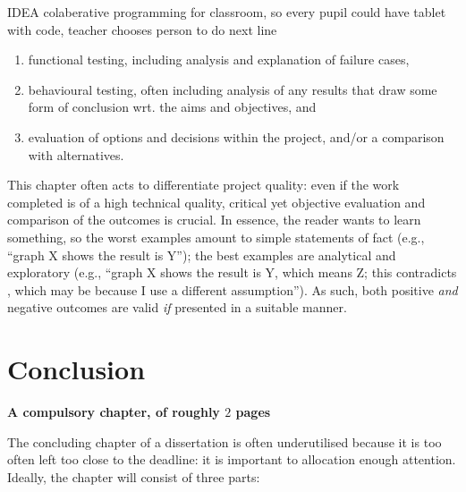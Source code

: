 \documentclass[ %
                    author={Jonathan Rankin},
                supervisor={Dr. David May, Dr. Ian Holyer},
                    degree={MEng},
                     title={CodeTouch},
                  subtitle={A Revolutionary Way To Program Real Code On Touch Screen Devices},
                      type={enterprise},
                      year={2015 } ]{dissertation}
\begin{document}
IDEA colaberative programming for classroom, so every pupil could have tablet with code, teacher chooses person to do next line

\begin{enumerate}
\item functional  testing, including analysis and explanation of failure 
      cases,
\item behavioural testing, often including analysis of any results that 
      draw some form of conclusion wrt. the aims and objectives,
      and
\item evaluation of options and decisions within the project, and/or a
      comparison with alternatives.
\end{enumerate}



\noindent
This chapter often acts to differentiate project quality: even if the work
completed is of a high technical quality, critical yet objective evaluation 
and comparison of the outcomes is crucial.  In essence, the reader wants to
learn something, so the worst examples amount to simple statements of fact 
(e.g., ``graph X shows the result is Y''); the best examples are analytical 
and exploratory (e.g., ``graph X shows the result is Y, which means Z; this 
contradicts , which may be because I use a different assumption'').  As 
such, both positive {\em and} negative outcomes are valid {\em if} presented 
in a suitable manner.


\chapter{Conclusion}
\label{chap:conclusion}

{\bf A compulsory chapter, of roughly $2$ pages} 
\vspace{1cm} 

\noindent
The concluding chapter of a dissertation is often underutilised because it 
is too often left too close to the deadline: it is important to allocation
enough attention.  Ideally, the chapter will consist of three parts:
\end{document}
